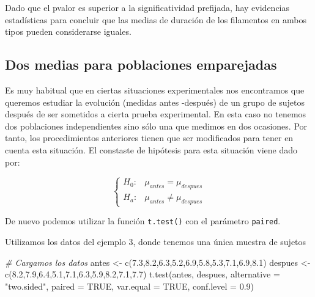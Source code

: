 \documentclass[
]{book}
\newenvironment{Shaded}{\begin{snugshade}}{\end{snugshade}}
\newcommand{\AttributeTok}[1]{\textcolor[rgb]{0.77,0.63,0.00}{#1}}
\newcommand{\CommentTok}[1]{\textcolor[rgb]{0.56,0.35,0.01}{\textit{#1}}}
\newcommand{\ConstantTok}[1]{\textcolor[rgb]{0.00,0.00,0.00}{#1}}
\newcommand{\FloatTok}[1]{\textcolor[rgb]{0.00,0.00,0.81}{#1}}
\newcommand{\FunctionTok}[1]{\textcolor[rgb]{0.00,0.00,0.00}{#1}}
\newcommand{\NormalTok}[1]{#1}
\newcommand{\OtherTok}[1]{\textcolor[rgb]{0.56,0.35,0.01}{#1}}
\newcommand{\StringTok}[1]{\textcolor[rgb]{0.31,0.60,0.02}{#1}}
\begin{document}
Dado que el pvalor es superior a la significatividad prefijada, hay evidencias estadísticas para concluir que las medias de duración de los filamentos en ambos tipos pueden considerarse iguales.

\hypertarget{dos-medias-para-poblaciones-emparejadas}{%
\subsection{Dos medias para poblaciones emparejadas}\label{dos-medias-para-poblaciones-emparejadas}}

Es muy habitual que en ciertas situaciones experimentales nos encontramos que queremos estudiar la evolución (medidas antes -después) de un grupo de sujetos después de ser sometidos a cierta prueba experimental. En esta caso no tenemos dos poblaciones independientes sino sólo una que medimos en dos ocasiones. Por tanto, los procedimientos anteriores tienen que ser modificados para tener en cuenta esta situación. El constaste de hipótesis para esta situación viene dado por:

\[\left\{\begin{array}{ll} H_0: & \mu_{antes} = \mu_{despues}\\ H_a: & \mu_{antes} \neq \mu_{despues} \end{array}\right.\]

De nuevo podemos utilizar la función \texttt{t.test()} con el parámetro \texttt{paired}.

Utilizamos los datos del ejemplo 3, donde tenemos una única muestra de sujetos

\begin{Shaded}
\begin{Highlighting}[]
\CommentTok{\# Cargamos los datos}
\NormalTok{antes }\OtherTok{\textless{}{-}} \FunctionTok{c}\NormalTok{(}\FloatTok{7.3}\NormalTok{,}\FloatTok{8.2}\NormalTok{,}\FloatTok{6.3}\NormalTok{,}\FloatTok{5.2}\NormalTok{,}\FloatTok{6.9}\NormalTok{,}\FloatTok{5.8}\NormalTok{,}\FloatTok{5.3}\NormalTok{,}\FloatTok{7.1}\NormalTok{,}\FloatTok{6.9}\NormalTok{,}\FloatTok{8.1}\NormalTok{)}
\NormalTok{despues }\OtherTok{\textless{}{-}} \FunctionTok{c}\NormalTok{(}\FloatTok{8.2}\NormalTok{,}\FloatTok{7.9}\NormalTok{,}\FloatTok{6.4}\NormalTok{,}\FloatTok{5.1}\NormalTok{,}\FloatTok{7.1}\NormalTok{,}\FloatTok{6.3}\NormalTok{,}\FloatTok{5.9}\NormalTok{,}\FloatTok{8.2}\NormalTok{,}\FloatTok{7.1}\NormalTok{,}\FloatTok{7.7}\NormalTok{)}
\FunctionTok{t.test}\NormalTok{(antes, despues, }\AttributeTok{alternative =} \StringTok{"two.sided"}\NormalTok{, }\AttributeTok{paired =} \ConstantTok{TRUE}\NormalTok{, }\AttributeTok{var.equal =} \ConstantTok{TRUE}\NormalTok{, }\AttributeTok{conf.level =} \FloatTok{0.9}\NormalTok{)}
\end{Highlighting}
\end{Shaded}
\end{document}
